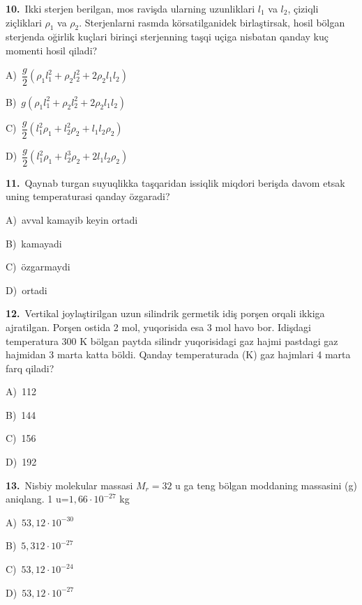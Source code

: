 \documentclass[11pt,a4paper]{article}
\newcommand{\opt}[2]{\hspace*{4mm}#1)\ #2\par}
\begin{document}
\noindent\begin{minipage}{\linewidth}
\textbf{10.}\ Ikki sterjen berilgan, mos ravişda ularning uzunliklari $l_1$ va $l_2$, çiziqli ziçliklari $\rho_1$ va $\rho_2$. Sterjenlarni rasmda körsatilganidek birlaştirsak, hosil bölgan sterjenda oğirlik kuçlari birinçi sterjenning taşqi uçiga nisbatan qanday kuç momenti hosil qiladi?\par\smallskip
\noindent\hspace*{4mm}\par\smallskip
\opt{A}{$\dfrac{g}{2}(\rho_1l_1^2+\rho_2l_2^2+2\rho_2l_1l_2)$}
\opt{B}{$g(\rho_1l_1^2+\rho_2l_2^2+2\rho_2l_1l_2)$}
\opt{C}{$\dfrac{g}{2}(l_1^2\rho_1+l_2^2\rho_2+l_1l_2\rho_2)$}
\opt{D}{$\dfrac{g}{2}(l_1^2\rho_1+l_2^3\rho_2+2l_1l_2\rho_2)$}
\end{minipage}\vspace{9pt}\par
\noindent\begin{minipage}{\linewidth}
\textbf{11.}\ Qaynab turgan suyuqlikka taşqaridan issiqlik miqdori berişda davom etsak uning temperaturasi qanday özgaradi?\par\smallskip
\opt{A}{avval kamayib keyin ortadi}
\opt{B}{kamayadi}
\opt{C}{özgarmaydi}
\opt{D}{ortadi}
\end{minipage}\vspace{9pt}\par
\noindent\begin{minipage}{\linewidth}
\textbf{12.}\ Vertikal joylaştirilgan uzun silindrik germetik idiş porşen orqali ikkiga ajratilgan. Porşen ostida 2 mol, yuqorisida esa 3 mol havo bor. Idişdagi temperatura 300 K bölgan paytda silindr yuqorisidagi gaz hajmi pastdagi gaz hajmidan 3 marta katta böldi. Qanday temperaturada (K) gaz hajmlari 4 marta farq qiladi?\par\smallskip
\opt{A}{112}
\opt{B}{144}
\opt{C}{156}
\opt{D}{192}
\end{minipage}\vspace{9pt}\par
\noindent\begin{minipage}{\linewidth}
\textbf{13.}\ Nisbiy molekular massasi $M_r = 32$ u ga teng bölgan moddaning massasini (g) aniqlang. 1 u=$1{,}66\cdot10^{-27}$ kg\par\smallskip
\opt{A}{$53{,}12\cdot10^{-30}$}
\opt{B}{$5{,}312\cdot10^{-27}$}
\opt{C}{$53{,}12\cdot10^{-24}$}
\opt{D}{$53{,}12\cdot10^{-27}$}
\end{minipage}\vspace{9pt}\par
\end{document}

